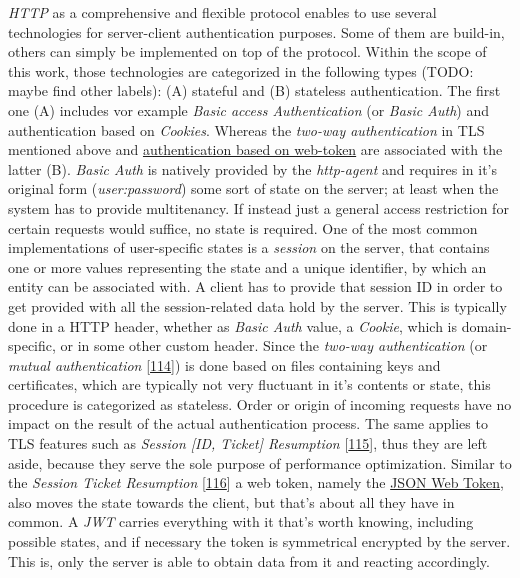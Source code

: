 \documentclass[12pt,english,a4paper,titlepage,cleardoublepage=empty,dottedtoc]{report}
\begin{document}
\emph{HTTP} as a comprehensive and flexible protocol enables to use
several technologies for server-client authentication purposes. Some of
them are build-in, others can simply be implemented on top of the
protocol. Within the scope of this work, those technologies are
categorized in the following types (TODO: maybe find other labels): (A)
stateful and (B) stateless authentication. The first one (A) includes
vor example \emph{Basic access Authentication} (or \emph{Basic Auth})
and authentication based on \emph{Cookies}. Whereas the \emph{two-way
authentication} in TLS mentioned above and
\protect\hyperlink{link_jwt}{authentication based on web-token} are
associated with the latter (B). \emph{Basic Auth} is natively provided
by the \emph{http-agent} and requires in it's original form
(\emph{user:password}) some sort of state on the server; at least when
the system has to provide multitenancy. If instead just a general access
restriction for certain requests would suffice, no state is required.
One of the most common implementations of user-specific states is a
\emph{session} on the server, that contains one or more values
representing the state and a unique identifier, by which an entity can
be associated with. A client has to provide that session ID in order to
get provided with all the session-related data hold by the server. This
is typically done in a HTTP header, whether as \emph{Basic Auth} value,
a \emph{Cookie}, which is domain-specific, or in some other custom
header. Since the \emph{two-way authentication} (or \emph{mutual
authentication}
{[}\protect\hyperlink{ref-web_2017_wikipedia_mutual-auth}{114}{]}) is
done based on files containing keys and certificates, which are
typically not very fluctuant in it's contents or state, this procedure
is categorized as stateless. Order or origin of incoming requests have
no impact on the result of the actual authentication process. The same
applies to TLS features such as \emph{Session {[}ID, Ticket{]}
Resumption}
{[}\protect\hyperlink{ref-book_2013_networking-101_tls-session-resumption}{115}{]},
thus they are left aside, because they serve the sole purpose of
performance optimization. Similar to the \emph{Session Ticket
Resumption}
{[}\protect\hyperlink{ref-web_spec_tls-session-ticket-resumption}{116}{]}
a web token, namely the \protect\hyperlink{link_jwt}{JSON Web Token},
also moves the state towards the client, but that's about all they have
in common. A \emph{JWT} carries everything with it that's worth knowing,
including possible states, and if necessary the token is symmetrical
encrypted by the server. This is, only the server is able to obtain data
from it and reacting accordingly.
\end{document}
